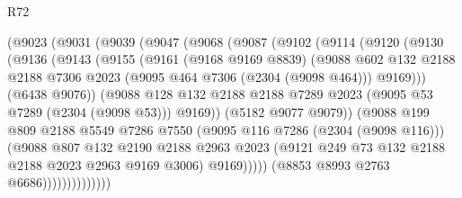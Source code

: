 \begin{lexlean}{R72}
\begin{coremodule}
                  (@9023
                    (@9031
                      (@9039
                        (@9047
                          (@9068
                            (@9087
                              (@9102
                                (@9114
                                  (@9120
                                    (@9130
                                      (@9136
                                        (@9143
                                          (@9155
                                            (@9161
                                              (@9168 @9169 @8839)
                                              (@9088
                                                @602
                                                @132
                                                @2188
                                                @2188
                                                @7306
                                                @2023
                                                (@9095 @464 @7306 (@2304 (@9098 @464)))
                                                @9169)))
                                          (@6438 @9076))
                                        (@9088
                                          @128
                                          @132
                                          @2188
                                          @2188
                                          @7289
                                          @2023
                                          (@9095 @53 @7289 (@2304 (@9098 @53)))
                                          @9169))
                                      (@5182 @9077 @9079))
                                    (@9088
                                      @199
                                      @809
                                      @2188
                                      @5549
                                      @7286
                                      @7550
                                      (@9095 @116 @7286 (@2304 (@9098 @116)))
                                      (@9088
                                        @807
                                        @132
                                        @2190
                                        @2188
                                        @2963
                                        @2023
                                        (@9121 @249 @73 @132 @2188 @2188 @2023 @2963 @9169 @3006)
                                        @9169)))))
                              (@8853 @8993 @2763 @6686))))))))))))))

\end{coremodule}
\end{lexlean}
